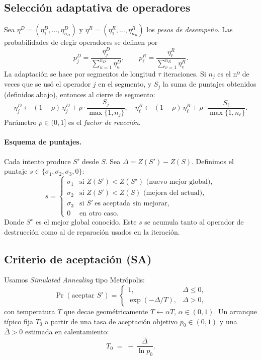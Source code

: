\documentclass[11pt, a4paper]{article}
\begin{document}
\subsection{Selección adaptativa de operadores}
Sea $\eta^D=(\eta_1^D,\dots,\eta_{n_D}^D)$ y $\eta^R=(\eta_1^R,\dots,\eta_{n_R}^R)$ los \emph{pesos de desempeño}.
Las probabilidades de elegir operadores se definen por
\[
p_j^D=\frac{\eta_j^D}{\sum_{u=1}^{n_D}\eta_u^D},\qquad
p_\ell^R=\frac{\eta_\ell^R}{\sum_{v=1}^{n_R}\eta_v^R}.
\]
La adaptación se hace por segmentos de longitud $\tau$ iteraciones. Si $n_j$ es el nº de veces que se usó el operador $j$ en el segmento, y $S_{j}$ la suma de puntajes obtenidos (definidos abajo), entonces al cierre de segmento:
\[
\eta_j^D \leftarrow (1-\rho)\,\eta_j^D + \rho\cdot \frac{S_{j}}{\max\{1,n_j\}},\quad
\eta_\ell^R \leftarrow (1-\rho)\,\eta_\ell^R + \rho\cdot \frac{S_{\ell}}{\max\{1,n_\ell\}}.
\]
Parámetro $\rho\in(0,1]$ es el \emph{factor de reacción}.

\paragraph{Esquema de puntajes.}
Cada intento produce $S'$ desde $S$. Sea $\Delta=Z(S')-Z(S)$. Definimos el puntaje $s\in\{\sigma_1,\sigma_2,\sigma_3,0\}$:
\[
s=\begin{cases}
\sigma_1 & \text{si } Z(S')<Z(S^\star) \text{ (nuevo mejor global)},\\
\sigma_2 & \text{si } Z(S')<Z(S) \text{ (mejora del actual)},\\
\sigma_3 & \text{si } S'\ \text{es aceptada sin mejorar},\\
0 & \text{en otro caso.}
\end{cases}
\]
Donde $S^\star$ es el mejor global conocido. Este $s$ se acumula tanto al operador de destrucción como al de reparación usados en la iteración.

\subsection{Criterio de aceptación (SA)}
Usamos \emph{Simulated Annealing} tipo Metrópolis:
\[
\Pr(\text{aceptar }S')=
\begin{cases}
1, & \Delta\le 0,\\
\exp(-\Delta/T), & \Delta>0,
\end{cases}
\]
con temperatura $T$ que decae geométricamente $T\leftarrow \alpha T$, $\alpha\in(0,1)$.
Un arranque típico fija $T_0$ a partir de una tasa de aceptación objetivo $p_0\in(0,1)$ y una $\overline{\Delta}>0$ estimada en calentamiento:
\[
T_0 \;=\; -\,\frac{\overline{\Delta}}{\ln p_0}.
\]
\end{document}
